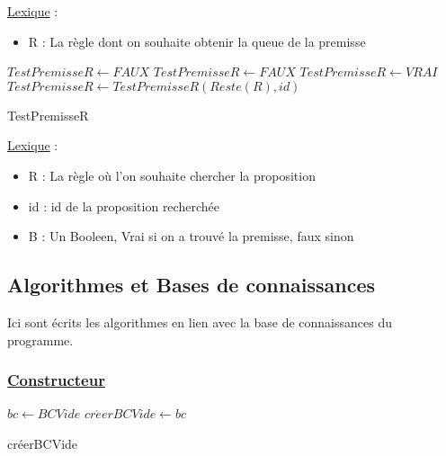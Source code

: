 \documentclass{article}
\begin{document}
\underline{Lexique} :
\begin{itemize}
    \item R : La règle dont on souhaite obtenir la queue de la premisse 
\end{itemize}

\clearpage
\begin{algorithm}
    \SetAlgoLined 
    
    \begin{algorithmic}
    
            \STATE $TestPremisseR \gets FAUX$
        \ENDIF
            \STATE $TestPremisseR \gets FAUX$
        \ELSE
                \STATE $TestPremisseR \gets VRAI$
            \ELSE
                \STATE $TestPremisseR \gets TestPremisseR(Reste(R),id)$
            \ENDIF
        \ENDIF

        
    \end{algorithmic}
    \caption{TestPremisseR}
\end{algorithm}

\underline{Lexique} :
\begin{itemize}
    \item R : La règle où l'on souhaite chercher la proposition
    \item id : id de la proposition recherchée
    \item B : Un Booleen, Vrai si on a trouvé la premisse, faux sinon
\end{itemize}

\clearpage
\subsection{Algorithmes et Bases de connaissances}
Ici sont écrits les algorithmes en lien avec la base de connaissances du programme.
\subsubsection{\underline{Constructeur}}
\begin{algorithm}
    \SetAlgoLined 
    \KwData{}
    
    \begin{algorithmic}
        \STATE $bc \gets BCVide$
        \STATE $cr\acute{e}erBCVide \gets bc$
    \end{algorithmic}
    \caption{créerBCVide}
\end{algorithm}
\end{document}
